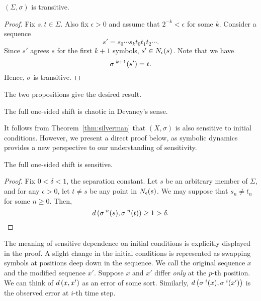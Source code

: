\documentclass[10pt,twoside]{book}
\begin{document}
\begin{proposition}
  $(\Sigma, \sigma)$ is transitive. 
  \begin{proof}
    Fix $s,t \in \Sigma$.
    Also fix $\epsilon > 0$ and assume that $2^{-k} < \epsilon$ for some $k$.
    Consider a sequence
    \begin{equation*}
      s' = s_0 \cdots s_k t_0 t_1 t_2 \cdots.
    \end{equation*}
    Since $s'$ agrees $s$ for the first $k+1$ symbols, $s' \in N_{\epsilon}(s)$.
    Note that we have
    \begin{equation*}
      \sigma^{\;k+1}(s') = t.
    \end{equation*}
    Hence, $\sigma$ is transitive.
  \end{proof}
\end{proposition}
The two propositions give the desired result.
\begin{theorem}
  The full one-sided shift is chaotic in Devaney's sense.
\end{theorem}
It follows from Theorem~\ref{thm:silverman} that $(X, \sigma)$ is also sensitive to initial conditions.
However, we present a direct proof below, as symbolic dynamics provides a new perspective to our understanding of sensitivity.
\begin{proposition}
  The full one-sided shift is sensitive.
  \begin{proof}
    Fix $0 < \delta < 1$, the separation constant.
    Let $s$ be an arbitrary member of $\Sigma$, and for any $\epsilon > 0$, let $t \neq s$ be any point in $N_{\epsilon}(s)$.
    We may suppose that $s_n \neq t_n$ for some $n \geq 0$.
    Then,
    \begin{equation*}
      d\left( \sigma^{\;n}(s), \sigma^{\;n}(t) \right) \geq 1 > \delta.
    \end{equation*}
  \end{proof}
\end{proposition}
The meaning of sensitive dependence on initial conditions is explicitly displayed in the proof.
A slight change in the initial conditions is represented as swapping symbols at positions deep down in the sequence.
We call the original sequence $x$ and the modified sequence $x'$.
Suppose $x$ and $x'$ differ \textit{only} at the $p$-th position.
We can think of $d\left( x, x' \right)$ as an error of some sort.
Similarly, $d\left( \sigma^{\;i}(x), \sigma^{\;i}(x') \right)$ is the observed error at $i$-th time step.
\end{document}
